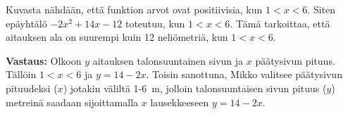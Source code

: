 \begin{esimerkki}
Kuvasta nähdään, että funktion arvot ovat positiivisia, kun $1<x<6$. Siten
epäyhtälö $-2x^2+14x-12$ toteutuu, kun $1<x<6$. Tämä tarkoittaa, että aitauksen ala on suurempi kuin 12 neliömetriä, kun $1<x<6$.

\textbf{Vastaus:} Olkoon $y$ aitauksen talonsuuntainen sivun ja $x$ päätysivun pituus. Tällöin $1<x<6$ ja $y=14-2x$. Toisin sanottuna, Mikko valitsee päätysivun pituudeksi ($x$) jotakin väliltä 1-6~m, jolloin talonsuuntaisen sivun pituus ($y$) metreinä saadaan sijoittamalla $x$ lausekkeeseen $y=14-2x$.
\end{esimerkki}

% 
% 
% 
% 
